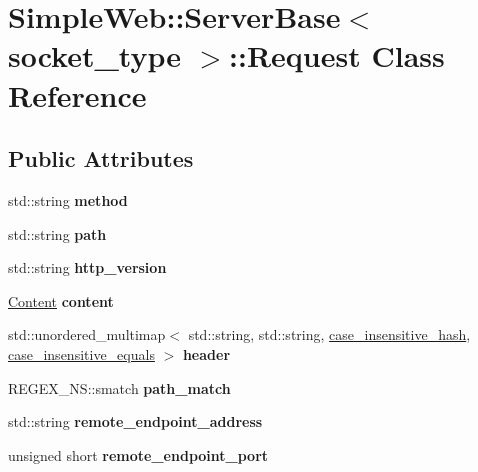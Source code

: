 \hypertarget{a00249}{}\section{Simple\+Web\+:\+:Server\+Base$<$ socket\+\_\+type $>$\+:\+:Request Class Reference}
\label{a00249}
\subsection*{Public Attributes}
\begin{DoxyCompactItemize}
\item 
std\+::string {\bfseries method}\hypertarget{a00249_a1fb7883b8e0e3a660117252f510f373c}{}\label{a00249_a1fb7883b8e0e3a660117252f510f373c}

\item 
std\+::string {\bfseries path}\hypertarget{a00249_aeb74bfe9b28c61dbf439f71ba752b0f7}{}\label{a00249_aeb74bfe9b28c61dbf439f71ba752b0f7}

\item 
std\+::string {\bfseries http\+\_\+version}\hypertarget{a00249_a09d25275bf1442fb384bad9be714e6ba}{}\label{a00249_a09d25275bf1442fb384bad9be714e6ba}

\item 
\hyperlink{a00065}{Content} {\bfseries content}\hypertarget{a00249_aa62ad9907bb75bb1da861167134f772e}{}\label{a00249_aa62ad9907bb75bb1da861167134f772e}

\item 
std\+::unordered\+\_\+multimap$<$ std\+::string, std\+::string, \hyperlink{a00051}{case\+\_\+insensitive\+\_\+hash}, \hyperlink{a00050}{case\+\_\+insensitive\+\_\+equals} $>$ {\bfseries header}\hypertarget{a00249_a6a7785d6de24ca7479c6a8c50752fcec}{}\label{a00249_a6a7785d6de24ca7479c6a8c50752fcec}

\item 
R\+E\+G\+E\+X\+\_\+\+N\+S\+::smatch {\bfseries path\+\_\+match}\hypertarget{a00249_ae9dc5e6dc6eb24e1faeb2c65b7ee7ba6}{}\label{a00249_ae9dc5e6dc6eb24e1faeb2c65b7ee7ba6}

\item 
std\+::string {\bfseries remote\+\_\+endpoint\+\_\+address}\hypertarget{a00249_a9689318cfa9b95862f6e1477071fb725}{}\label{a00249_a9689318cfa9b95862f6e1477071fb725}

\item 
unsigned short {\bfseries remote\+\_\+endpoint\+\_\+port}\hypertarget{a00249_ab44a4b842b5144fcb88df1d3a3aff92f}{}\label{a00249_ab44a4b842b5144fcb88df1d3a3aff92f}

\end{DoxyCompactItemize}
